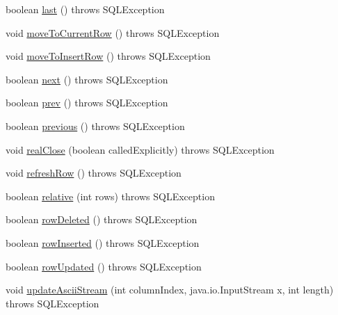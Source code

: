 \begin{DoxyCompactItemize}
\item 
boolean \mbox{\hyperlink{classcom_1_1mysql_1_1jdbc_1_1_updatable_result_set_ae4132b5cb109e8e6a2179896f09e1254}{last}} ()  throws S\+Q\+L\+Exception 
\item 
void \mbox{\hyperlink{classcom_1_1mysql_1_1jdbc_1_1_updatable_result_set_aaae4d889848e114324a20bb5badc6c89}{move\+To\+Current\+Row}} ()  throws S\+Q\+L\+Exception 
\item 
void \mbox{\hyperlink{classcom_1_1mysql_1_1jdbc_1_1_updatable_result_set_a46ec028d5e4a8f1ca9541177fef43545}{move\+To\+Insert\+Row}} ()  throws S\+Q\+L\+Exception 
\item 
boolean \mbox{\hyperlink{classcom_1_1mysql_1_1jdbc_1_1_updatable_result_set_abdc79070aa1242eda4a1e024f3e5e544}{next}} ()  throws S\+Q\+L\+Exception 
\item 
boolean \mbox{\hyperlink{classcom_1_1mysql_1_1jdbc_1_1_updatable_result_set_a6c5a8bfdbea2d715e45003935e83e9bc}{prev}} ()  throws S\+Q\+L\+Exception 
\item 
boolean \mbox{\hyperlink{classcom_1_1mysql_1_1jdbc_1_1_updatable_result_set_a8e765bdd7ae0094837a347f5f77486ce}{previous}} ()  throws S\+Q\+L\+Exception 
\item 
void \mbox{\hyperlink{classcom_1_1mysql_1_1jdbc_1_1_updatable_result_set_a56e7da4266eef885ba3dfc5005e30525}{real\+Close}} (boolean called\+Explicitly)  throws S\+Q\+L\+Exception 
\item 
void \mbox{\hyperlink{classcom_1_1mysql_1_1jdbc_1_1_updatable_result_set_a7152d037ea38ea45e9cadccd9c9c2639}{refresh\+Row}} ()  throws S\+Q\+L\+Exception 
\item 
boolean \mbox{\hyperlink{classcom_1_1mysql_1_1jdbc_1_1_updatable_result_set_abd0833173b4a94df90e67b08f98079ef}{relative}} (int rows)  throws S\+Q\+L\+Exception 
\item 
boolean \mbox{\hyperlink{classcom_1_1mysql_1_1jdbc_1_1_updatable_result_set_a64824468904a1fc69bc116d10d4a274f}{row\+Deleted}} ()  throws S\+Q\+L\+Exception 
\item 
boolean \mbox{\hyperlink{classcom_1_1mysql_1_1jdbc_1_1_updatable_result_set_a50cd8500080d2403e86b968b0cd9718b}{row\+Inserted}} ()  throws S\+Q\+L\+Exception 
\item 
boolean \mbox{\hyperlink{classcom_1_1mysql_1_1jdbc_1_1_updatable_result_set_a220d6c10abf185de3588e99132f5f68f}{row\+Updated}} ()  throws S\+Q\+L\+Exception 
\item 
void \mbox{\hyperlink{classcom_1_1mysql_1_1jdbc_1_1_updatable_result_set_ae9825fb720315b94d84b8b28d92d4921}{update\+Ascii\+Stream}} (int column\+Index, java.\+io.\+Input\+Stream x, int length)  throws S\+Q\+L\+Exception 

\end{DoxyCompactItemize}
